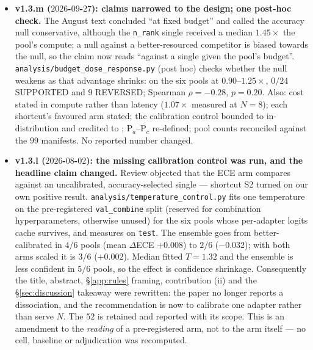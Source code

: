 \documentclass[11pt]{article}
\begin{document}
\begin{itemize}[leftmargin=*]
\item \textbf{v1.3.m ($2026$-$09$-$27$): claims narrowed to the design; one post-hoc check.} The August text concluded ``at fixed budget'' and called the accuracy null conservative, although the \texttt{n\_rank} single received a median $1.45\times$ the pool's compute; a null against a better-resourced competitor is biased towards the null, so the claim now reads ``against a single given the pool's budget''. \texttt{analysis/\allowbreak budget\_\allowbreak dose\_\allowbreak response.\allowbreak py} (post hoc) checks whether the null weakens as that advantage shrinks: on the six pools at $0.90$--$1.25\times$, $0/24$ SUPPORTED and $9$ REVERSED; Spearman $\rho{=}{-}0.28$, $p{=}0.20$. Also: cost stated in compute rather than latency ($1.07\times$ measured at $N{=}8$); each shortcut's favoured arm stated; the calibration control bounded to in-distribution \citep{ovadia2019trust} and credited to \citet{ashukha2020pitfalls}; P$_a$--P$_c$ re-defined; pool counts reconciled against the $99$ manifests. No reported number changed.
\item \textbf{v1.3.l ($2026$-$08$-$02$): the missing calibration control was run, and the headline claim changed.} Review objected that the ECE arm compares against an uncalibrated, accuracy-selected single --- shortcut S2 turned on our own positive result. \texttt{analysis/\allowbreak temperature\_\allowbreak control.\allowbreak py} fits one temperature on the pre-registered \texttt{val\_combine} split (reserved for combination hyperparameters, otherwise unused) for the six pools whose per-adapter logits cache survives, and measures on \texttt{test}. The ensemble goes from better-calibrated in $4/6$ pools (mean $\Delta$ECE ${+}0.008$) to $2/6$ (${-}0.032$); with both arms scaled it is $3/6$ (${+}0.002$). Median fitted $T{=}1.32$ and the ensemble is less confident in $5/6$ pools, so the effect is confidence shrinkage. Consequently the title, abstract, \S\ref{app:rules} framing, contribution (ii) and the \S\ref{sec:discussion} takeaway were rewritten: the paper no longer reports a dissociation, and the recommendation is now to calibrate one adapter rather than serve $N$. The $52$ is retained and reported with its scope. This is an amendment to the \emph{reading} of a pre-registered arm, not to the arm itself --- no cell, baseline or adjudication was recomputed.

\end{itemize}
\end{document}
